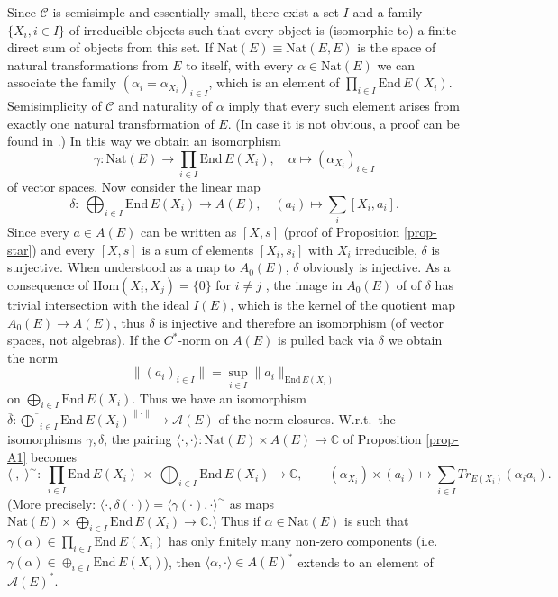 \documentclass[12pt]{article}
\theoremstyle{definition}
\theoremstyle{definition}
\theoremstyle{remark}
\def\2#1{{\mathcal #1}}
\def\7#1{{\mathbb #1}}
\def\ol#1{{\overline #1}}
\newcommand{\Hom}{\mathrm{Hom}}
\newcommand{\End}{\mathrm{End}}
\newcommand{\rarr}{\rightarrow}
\newcommand{\Nat}{\mathrm{Nat}}
\begin{document}
Since $\2C$ is semisimple and essentially small, there exist a set $I$ and a family 
$\{X_i, i\in I\}$ of irreducible objects such that every object is (isomorphic to) a finite direct
sum of objects from this set. If $\Nat(E)\equiv\Nat(E,E)$ is the space of natural transformations
from $E$ to itself, with every $\alpha\in\Nat(E)$ we can associate the family
$(\alpha_i=\alpha_{X_i})_{i\in I}$, which is an element of $\prod_{i\in  I}\End\,E(X_i)$. 
Semisimplicity of $\2C$ and naturality of $\alpha$ imply that every such element arises from exactly
one natural transformation of $E$. (In case it is not obvious, a proof can be found in
\cite[Proposition 5.4]{MRT}.) In this way we obtain an isomorphism  
\[ \gamma: \Nat(E)\rarr\prod_{i\in I}\End\,E(X_i), \quad \alpha\mapsto(\alpha_{X_i})_{i\in I} \]
of vector spaces. Now consider the linear map
\[ \delta:\ \bigoplus_{i\in I} \End\,E(X_i)\rarr A(E), \quad (a_i)\mapsto \sum_i [X_i,a_i]. \]
Since every $a\in A(E)$ can be written as $[X,s]$ (proof of Proposition \ref{prop-star}) and every
$[X,s]$ is a sum of elements $[X_i,s_i]$ with $X_i$ irreducible,
$\delta$ is surjective. When understood as a map to $A_0(E)$,
$\delta$ obviously is injective. As a consequence of $\Hom(X_i,X_j)=\{0\}$ for $i\ne j$ ,
the image in $A_0(E)$ of of $\delta$ has trivial intersection with the ideal $I(E)$, which
is the kernel of the quotient map $A_0(E)\rarr A(E)$, thus $\delta$ is injective and
therefore an isomorphism (of vector spaces, not algebras). 
If the $C^*$-norm on $A(E)$ is pulled back via $\delta$ we obtain the norm
\[ \| (a_i)_{i\in I} \| = \sup_{i\in I} \|a_i\|_{\End\,E(X_i)} \]
on $\bigoplus_{i\in I} \End\,E(X_i)$. Thus we have an isomorphism 
$\ol{\delta}:\ol{\bigoplus_{i\in I}\End\,E(X_i)}^{\|\cdot\|}\rarr\2A(E)$ of the norm closures.
W.r.t.\ the isomorphisms $\gamma,\delta$,
the pairing $\langle\cdot,\cdot\rangle: \Nat(E)\times A(E)\rarr\7C$ of Proposition \ref{prop-A1}
becomes
\[ \langle\cdot,\cdot\rangle^\sim:\ \prod_{i\in I}\End\,E(X_i) \ \times\ \bigoplus_{i\in I}
   \End\,E(X_i)\rarr\7C, \quad\quad 
   (\alpha_{X_i})\times(a_i)\mapsto \sum_{i\in I} Tr_{E(X_i)}(\alpha_ia_i). \]
(More precisely: $\langle \cdot,\delta(\cdot)\rangle=\langle\gamma(\cdot),\cdot\rangle^\sim$ as maps
$\Nat(E)\times\bigoplus_{i\in I} \End\,E(X_i)\rarr\7C$.)
Thus if $\alpha\in\Nat(E)$ is such that $\gamma(\alpha)\in\prod_{i\in I}\End\,E(X_i)$ has only
finitely many non-zero components (i.e.\ $\gamma(\alpha)\in\oplus_{i\in I}\End\,E(X_i)$), then
$\langle\alpha,\cdot\rangle\in A(E)^*$  extends to an element of $\2A(E)^*$. 
\end{document}
